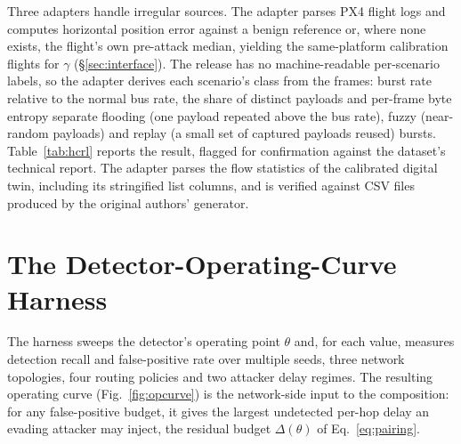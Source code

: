 Three adapters handle irregular sources. The 
adapter parses PX4 flight logs and computes horizontal position error against a
benign reference or, where none exists, the flight's own pre-attack median,
yielding the same-platform calibration flights for $\gamma$
(\S\ref{sec:interface}). The  release has no
machine-readable per-scenario labels, so the adapter derives each scenario's
class from the frames: burst rate relative to the normal bus rate, the share of
distinct payloads and per-frame byte entropy separate flooding (one payload
repeated above the bus rate), fuzzy (near-random payloads) and replay (a small
set of captured payloads reused) bursts. Table~\ref{tab:hcrl} reports the result,
flagged for confirmation against the dataset's technical report. The
 adapter parses the flow statistics of the calibrated digital
twin, including its stringified list columns, and is verified against CSV files
produced by the original authors' generator.

\begin{table}[t]
\centering
\caption{The corpus as actually ingested. Counts come from schema-validated
adapter outputs; every record validates against the schema of
\S\ref{sec:schema}.}
\label{tab:ingest}
\footnotesize
\renewcommand{\arraystretch}{1.1}

\end{table}

\begin{table}[t]
\centering
\caption{Attack classes derived from the frames of the 
scenarios, inferred from burst rate, share of distinct payloads and byte
entropy; scenarios that exhibit more than one burst shape map to
.}
\label{tab:hcrl}
\footnotesize
\renewcommand{\arraystretch}{1.05}

\end{table}

\section{The Detector-Operating-Curve Harness}
\label{sec:harness}
The harness sweeps the detector's operating point $\theta$ and, for each value,
measures detection recall and false-positive rate over multiple seeds, three
network topologies, four routing policies and two attacker delay regimes. The
resulting operating curve (Fig.~\ref{fig:opcurve}) is the network-side input to
the composition: for any false-positive budget, it gives the largest undetected
per-hop delay an evading attacker may inject, the residual budget
$\Delta(\theta)$ of Eq.~\eqref{eq:pairing}.

